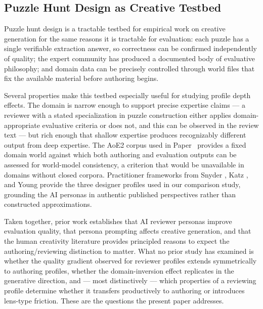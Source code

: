 \subsection{Puzzle Hunt Design as Creative Testbed}

Puzzle hunt design is a tractable testbed for empirical work on creative generation for the same reasons it is tractable for evaluation: each puzzle has a single verifiable extraction answer, so correctness can be confirmed independently of quality; the expert community has produced a documented body of evaluative philosophy; and domain data can be precisely controlled through world files that fix the available material before authoring begins.

Several properties make this testbed especially useful for studying profile depth effects. The domain is narrow enough to support precise expertise claims --- a reviewer with a stated specialization in puzzle construction either applies domain-appropriate evaluative criteria or does not, and this can be observed in the review text --- but rich enough that shallow expertise produces recognizably different output from deep expertise. The AoE2 corpus used in Paper~\cite{dellaLibera2025panelcreative} provides a fixed domain world against which both authoring and evaluation outputs can be assessed for world-model consistency, a criterion that would be unavailable in domains without closed corpora. Practitioner frameworks from Snyder \cite{snyder2019craftsmanship}, Katz \cite{katz2021crossword}, and Young \cite{young2018visual} provide the three designer profiles used in our comparison study, grounding the AI personas in authentic published perspectives rather than constructed approximations.

\medskip

Taken together, prior work establishes that AI reviewer personas improve evaluation quality, that persona prompting affects creative generation, and that the human creativity literature provides principled reasons to expect the authoring/reviewing distinction to matter. What no prior study has examined is whether the quality gradient observed for reviewer profiles extends symmetrically to authoring profiles, whether the domain-inversion effect replicates in the generative direction, and --- most distinctively --- which properties of a reviewing profile determine whether it transfers productively to authoring or introduces lens-type friction. These are the questions the present paper addresses.
